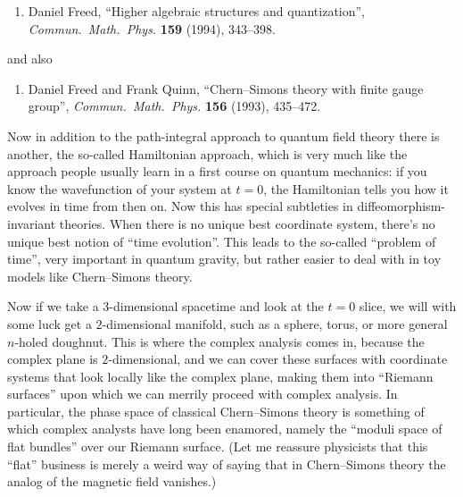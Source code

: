 \documentclass[12pt]{article}
\def\tightlist{}
\begin{document}
\begin{enumerate}
\def\labelenumi{\arabic{enumi})}
\setcounter{enumi}{1}
\tightlist
\item
  Daniel Freed, ``Higher algebraic structures and quantization'',
  \emph{Commun.\ Math.\ Phys.} \textbf{159} (1994), 343--398.
\end{enumerate}
\noindent
and also

\begin{enumerate}
\def\labelenumi{\arabic{enumi})}
\setcounter{enumi}{2}
\tightlist
\item
  Daniel Freed and
  Frank Quinn, ``Chern--Simons theory with finite gauge group'', 
  \emph{Commun.\ Math.\ Phys.} \textbf{156} (1993), 435--472.
\end{enumerate}

Now in addition to the path-integral approach to quantum field theory
there is another, the so-called Hamiltonian approach, which is very much
like the approach people usually learn in a first course on quantum
mechanics: if you know the wavefunction of your system at \(t = 0\), the
Hamiltonian tells you how it evolves in time from then on. Now this has
special subtleties in diffeomorphism-invariant theories. When there is
no unique best coordinate system, there's no unique best notion of
``time evolution''. This leads to the so-called ``problem of time'',
very important in quantum gravity, but rather easier to deal with in toy
models like Chern--Simons theory.

Now if we take a \(3\)-dimensional spacetime and look at the \(t = 0\)
slice, we will with some luck get a \(2\)-dimensional manifold, such as
a sphere, torus, or more general \(n\)-holed doughnut. This is where the
complex analysis comes in, because the complex plane is
\(2\)-dimensional, and we can cover these surfaces with coordinate
systems that look locally like the complex plane, making them into
``Riemann surfaces'' upon which we can merrily proceed with complex
analysis. In particular, the phase space of classical Chern--Simons
theory is something of which complex analysts have long been enamored,
namely the ``moduli space of flat bundles'' over our Riemann surface.
(Let me reassure physicists that this ``flat'' business is merely a
weird way of saying that in Chern--Simons theory the analog of the
magnetic field vanishes.)
\end{document}

